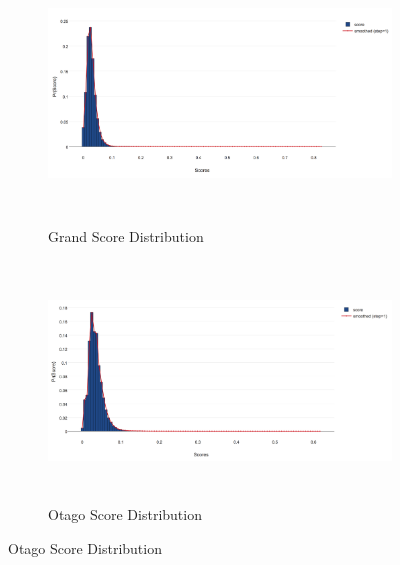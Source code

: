 \begin{figure}[htb]
  \begin{subfigure}[t]{\textwidth}
    \centering
    \includegraphics[height=2.7in]{dataset/grand/scores}
    \caption{Grand Score Distribution}
    \label{fig:grand_scores} %
  \end{subfigure}
  \begin{subfigure}[t]{\textwidth}
    \centering
    \includegraphics[height=2.5in]{dataset/otago/scores}
    \caption{Otago Score Distribution}
    \label{fig:otago_scores} %
  \end{subfigure}
\end{figure}
